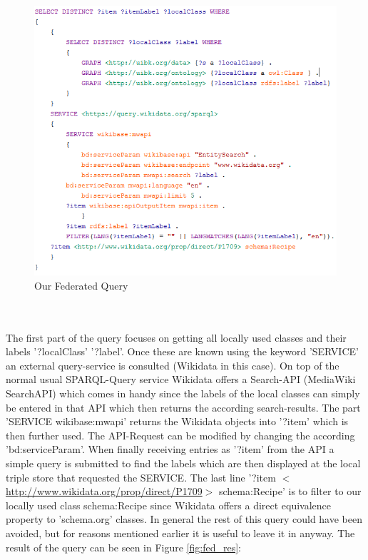 \documentclass{article}
\begin{document}
\begin{figure}[H]
  \centering
  \includegraphics[width=12cm]{pictures/fed_query2.png}
  \caption{Our Federated Query}
  \label{fig:fed}
\end{figure}
\noindent
\\ \\
The first part of the query focuses on getting all locally used classes and their labels '?localClass' '?label'. Once these are known using the keyword 'SERVICE' an external query-service is consulted (Wikidata in this case). On top of the normal usual SPARQL-Query service Wikidata offers a Search-API (MediaWiki SearchAPI) which comes in handy since the labels of the local classes can simply be entered in that API which then returns the according search-results. The part 'SERVICE wikibase:mwapi' returns the Wikidata objects into '?item' which is then further used. The API-Request can be modified by changing the according 'bd:serviceParam'. When finally receiving entries as '?item' from the API a simple query is submitted to find the labels which are then displayed at the local triple store that requested the SERVICE. The last line '?item $<$\url{http://www.wikidata.org/prop/direct/P1709}$>$ schema:Recipe' is to filter to our locally used class schema:Recipe since Wikidata offers a direct equivalence property to 'schema.org' classes. In general the rest of this query could have been avoided, but for reasons mentioned earlier it is useful to leave it in anyway. The result of the query can be seen in Figure \ref{fig:fed_res}:
\end{document}
